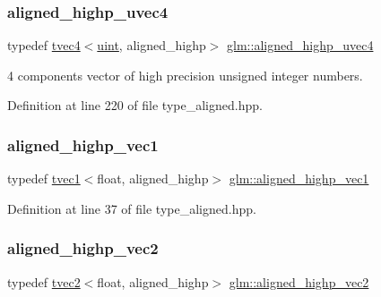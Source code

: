 \subsubsection{\texorpdfstring{aligned\_highp\_uvec4}{aligned\_highp\_uvec4}}
{\footnotesize\ttfamily typedef \mbox{\hyperlink{structglm_1_1tvec4}{tvec4}}$<$\mbox{\hyperlink{group__core__precision_ga4fd29415871152bfb5abd588334147c8}{uint}}, aligned\+\_\+highp$>$ \mbox{\hyperlink{group__gtc__type__aligned_ga15c8f3d51b9df35dbf8bf2276512588b}{glm\+::aligned\+\_\+highp\+\_\+uvec4}}}



4 components vector of high precision unsigned integer numbers. 



Definition at line 220 of file type\+\_\+aligned.\+hpp.

\mbox{\label{group__gtc__type__aligned_ga5d83af334bd222c85f73bf37eecf4768}} 
\subsubsection{\texorpdfstring{aligned\_highp\_vec1}{aligned\_highp\_vec1}}
{\footnotesize\ttfamily typedef \mbox{\hyperlink{structglm_1_1tvec1}{tvec1}}$<$float, aligned\+\_\+highp$>$ \mbox{\hyperlink{group__gtc__type__aligned_ga5d83af334bd222c85f73bf37eecf4768}{glm\+::aligned\+\_\+highp\+\_\+vec1}}}



Definition at line 37 of file type\+\_\+aligned.\+hpp.

\mbox{\label{group__gtc__type__aligned_ga5873b18cca2602c92bb077e663e29bbd}} 
\subsubsection{\texorpdfstring{aligned\_highp\_vec2}{aligned\_highp\_vec2}}
{\footnotesize\ttfamily typedef \mbox{\hyperlink{structglm_1_1tvec2}{tvec2}}$<$float, aligned\+\_\+highp$>$ \mbox{\hyperlink{group__gtc__type__aligned_ga5873b18cca2602c92bb077e663e29bbd}{glm\+::aligned\+\_\+highp\+\_\+vec2}}}

